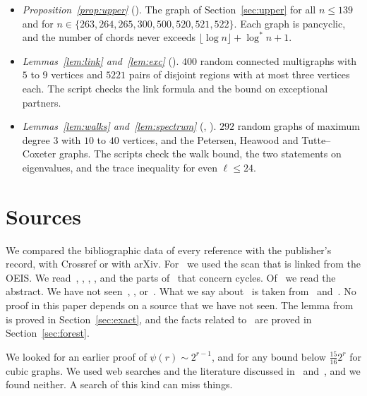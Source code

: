\documentclass[11pt]{article}
\theoremstyle{definition}
\theoremstyle{remark}
\newcommand{\lgs}{\log^{*}}
\numberwithin{equation}{section}
\begin{document}
\begin{itemize}
with $7$ vertices and at least $8$ edges outside $W$. Graphs with more than $|V(G)|+3$ edges outside $W$ are skipped, because
Lemma~\ref{lem:EP} excludes them. Without a wasted outside part, the largest value of
$\beta(G)-\beta(W)-|V(W)|$ was $1$ for the triangle and $0$ for the four-cycle.
\item \emph{Proposition~\ref{prop:upper}} (). The graph of
Section~\ref{sec:upper} for all $n\le139$ and for $n\in\{263,264,265,300,500,520,521,522\}$. Each
graph is pancyclic, and the number of chords never exceeds $\lfloor\log n\rfloor+\lgs n+1$.
\item \emph{Lemmas~\ref{lem:link} and~\ref{lem:exc}} (). $400$ random connected
multigraphs with $5$ to $9$ vertices and $5221$ pairs of disjoint regions with at most three
vertices each. The script checks the link formula and the bound on exceptional partners.
\item \emph{Lemmas~\ref{lem:walks} and~\ref{lem:spectrum}} (,
). $292$ random graphs of maximum degree $3$ with $10$ to $40$ vertices, and the
Petersen, Heawood and Tutte--Coxeter graphs. The scripts check the walk bound, the two statements
on eigenvalues, and the trace inequality for even $\ell\le24$.
\end{itemize}

\section{Sources}\label{app:sources}

We compared the bibliographic data of every reference with the publisher's record, with Crossref
or with arXiv. For~\cite{ES} we used the scan that is linked from the OEIS. We
read~\cite{AACST}, \cite{ES}, \cite{Griffin}, \cite{KNT}, and the parts of~\cite{HK} that concern
cycles. Of~\cite{AT} we read the abstract. We have not seen~\cite{Bass}, \cite{Bondy},
\cite{EP} or~\cite{KS}. What we say about~\cite{Bondy} is taken from~\cite{Bloom}
and~\cite{KNT}. No proof in this paper depends on a source that we have not seen. The lemma
from~\cite{EP} is proved in Section~\ref{sec:exact}, and the facts related to~\cite{Bass,KS} are
proved in Section~\ref{sec:forest}.

We looked for an earlier proof of $\psi(r)\sim2^{r-1}$, and for any bound below
$\frac{15}{16}2^{r}$ for cubic graphs. We used web searches and the literature discussed
in~\cite{AACST} and~\cite{HK}, and we found neither. A search of this kind can miss things.
\end{document}
